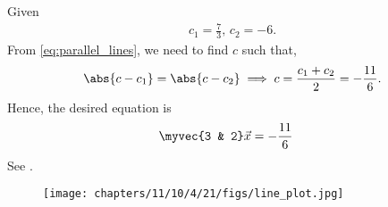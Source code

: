 Given
\begin{align}
	c_1 = \frac{7}{3},\,
c_2 = -6.
\end{align}
	From \eqref{eq:parallel_lines},
we need to find $c$ such that,
\begin{align}
	\abs{c-c_1} = \abs{c-c_2} \implies c = \frac{c_1+c_2}{2}
	 = -\frac{11}{6}.
\end{align}
Hence, the desired equation is
\begin{align}
	\myvec{3 & 2}\vec{x} &= -\frac{11}{6}
\end{align}
	See .
\begin{figure}[H]
	\centering
	\texttt{[image: chapters/11/10/4/21/figs/line\_plot.jpg]}
	\caption{}
	\label{fig:chapters/11/10/4/21/1}
\end{figure}
